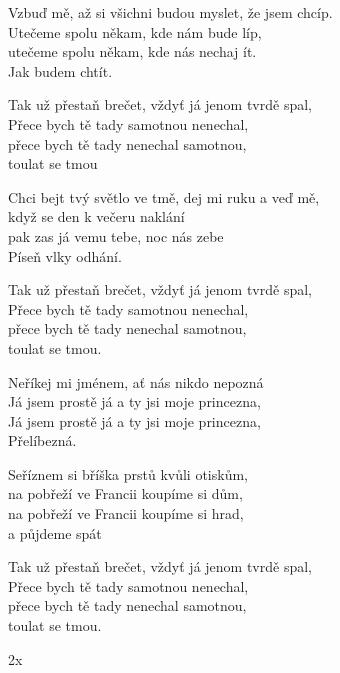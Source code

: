 
\vspace{-2pt}
\ve{}
Vzbuď mě, až si všichni budou myslet, že jsem chcíp.\\
Utečeme spolu někam, kde nám bude líp,\\
utečeme spolu někam, kde nás nechaj ít.\\
Jak budem chtít.

\vspace{-2pt}
\ve{}
Tak už přestaň brečet, vždyť já jenom tvrdě spal,\\
Přece bych tě tady samotnou nenechal,\\
přece bych tě tady nenechal samotnou,\\
toulat se tmou

\vspace{-4pt}
\cho{}
Chci bejt tvý světlo ve tmě, dej mi ruku a veď mě,\\
když se den k večeru naklání\\
pak zas já vemu tebe, noc nás zebe\\
Píseň vlky odhání.

\vspace{-4pt}
\ve{}
Tak už přestaň brečet, vždyť já jenom tvrdě spal,\\
Přece bych tě tady samotnou nenechal,\\
přece bych tě tady nenechal samotnou,\\
toulat se tmou.

\vspace{-4pt}
\cho{}

\vspace{-4pt}
\ve{}
Neříkej mi jménem, ať nás nikdo nepozná\\
Já jsem prostě já a ty jsi moje princezna,\\
Já jsem prostě já a ty jsi moje princezna, \\
Přelíbezná.

\vspace{-4pt}
\ve{}
Seříznem si bříška prstů kvůli otiskům,\\
na pobřeží ve Francii koupíme si dům,\\
na pobřeží ve Francii koupíme si hrad,\\
a půjdeme spát

\vspace{-4pt}
\cho{}

\vspace{-4pt}
\ve{}
Tak už přestaň brečet, vždyť já jenom tvrdě spal,\\
Přece bych tě tady samotnou nenechal,\\
přece bych tě tady nenechal samotnou,\\
toulat se tmou.

\vspace{-4pt}
\cho{}
2x

\esong{}